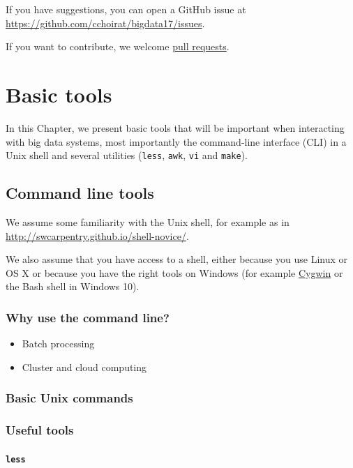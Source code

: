 \documentclass[]{book}
\theoremstyle{definition}
\theoremstyle{definition}
\theoremstyle{definition}
\theoremstyle{remark}
\begin{document}
If you have suggestions, you can open a GitHub issue at
\url{https://github.com/cchoirat/bigdata17/issues}.

If you want to contribute, we welcome
\href{https://help.github.com/articles/about-pull-requests/}{pull
requests}.

\chapter{Basic tools}\label{basics}

In this Chapter, we present basic tools that will be important when
interacting with big data systems, most importantly the command-line
interface (CLI) in a Unix shell and several utilities (\texttt{less},
\texttt{awk}, \texttt{vi} and \texttt{make}).

\section{Command line tools}\label{command-line-tools}

We assume some familiarity with the Unix shell, for example as in
\url{http://swcarpentry.github.io/shell-novice/}.

We also assume that you have access to a shell, either because you use
Linux or OS X or because you have the right tools on Windows (for
example \href{https://www.cygwin.com/}{Cygwin} or the Bash shell in
Windows 10).

\subsection{Why use the command line?}\label{why-use-the-command-line}

\begin{itemize}
\item
  Batch processing
\item
  Cluster and cloud computing
\end{itemize}

\subsection{Basic Unix commands}\label{basic-unix-commands}

\subsection{Useful tools}\label{useful-tools}

\subsubsection{\texorpdfstring{\texttt{less}}{less}}\label{less}
\end{document}
